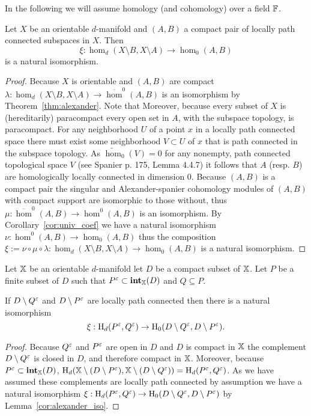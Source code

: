 In the following we will assume homology (and cohomology) over a field $\mathbb{F}$.

\begin{lemma}\label{cor:alexander_iso}
  Let $X$ be an orientable $d$-manifold and $(A,B)$ a compact pair of locally path connected subspaces in $X$.
  Then
  \[\xi : \hom_d(X\setminus B, X\setminus  A)\to \hom_0(A, B)\]
  is a natural isomorphism.
\end{lemma}
\begin{proof}
  Because $X$ is orientable and $(A,B)$ are compact $\lambda : \hom_d(X\setminus B, X\setminus A)\to \overline{\hom}^{0}(A, B)$ is an isomorphism by Theorem~\ref{thm:alexander}.
  Note that
  Moreover, because every subset of $X$ is (hereditarily) paracompact every open set in $A$, with the subspace topology, is paracompact.
  For any neighborhood $U$ of a point $x$ in a locally path connected space there must exist some neighborhood $V\subset U$ of $x$ that is path connected in the subspace topology.
  As $\tilde{\hom}_0(V) = 0$ for any nonempty, path connected topological space $V$ (see Spanier p. 175, Lemma 4.4.7) it follows that $A$ (resp. $B$) are homologically locally connected in dimension $0$.
  Because $(A,B)$ is a compact pair the singular and Alexander-spanier cohomology modules of $(A,B)$ with compact support are isomorphic to those without, thus $\mu:\overline{\hom}^{0}(A, B)\to \hom^0(A, B)$ is an isomorphism.
  By Corollary~\ref{cor:univ_coef} we have a natural isomorphism $\nu : \hom^0(A, B)\to\hom_0(A, B)$ thus the composition $\xi := \nu\circ\mu\circ\lambda : \hom_d(X\setminus B, X\setminus  A)\to \hom_0(A, B)$ is a natural isomorphism.
\end{proof}

\begin{lemma}\label{lem:duality_apply}
  Let $\mathbb{X}$ be an orientable $d$-manifold let $D$ be a compact subset of $\mathbb{X}$.
  Let $P$ be a finite subset of $D$ such that $P^\varepsilon\subset \mathbf{int}_{\mathbb{X}}(D)$ and $Q\subseteq P$.

  If $D\setminus Q^\varepsilon$ and $D\setminus P^\varepsilon$ are locally path connected then there is a natural isomorphism
  \[ \xi : \mathrm{H}_d(P^\varepsilon,Q^\varepsilon)\to \mathrm{H}_0(D\setminus Q^\varepsilon, D\setminus P^\varepsilon).\]
\end{lemma}
\begin{proof}
  Because $Q^\varepsilon$ and $P^\varepsilon$ are open in $D$ and $D$ is compact in $\mathbb{X}$ the complement $D\setminus Q^\varepsilon$ is closed in $D$, and therefore compact in $\mathbb{X}$.
  Moreover, because $P^\varepsilon\subset \mathbf{int}_{\mathbb{X}}(D)$, $\mathrm{H}_d(\mathbb{X}\setminus(D\setminus P^\varepsilon), \mathbb{X}\setminus(D\setminus Q^\varepsilon)) = \mathrm{H}_d(P^\varepsilon, Q^\varepsilon)$.
  As we have assumed these complements are locally path connected by assumption we have a natural isomorphism $\xi : \mathrm{H}_d(P^\varepsilon, Q^\varepsilon)\to \mathrm{H}_0(D\setminus Q^\varepsilon, D\setminus P^\varepsilon)$
  by Lemma~\ref{cor:alexander_iso}.
\end{proof}
